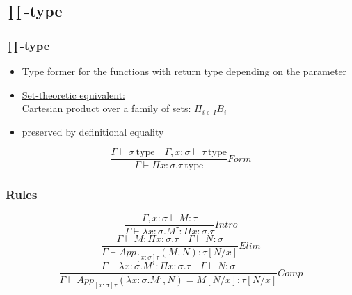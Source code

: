 \documentclass[aspectratio=169]{beamer}
\newcommand{\typ}{\ \mathrm{type}}
\newcommand{\app}[2]{App_{[x:\sigma]\tau}(#1, #2)}
\newcommand{\C}{Comp}
\newcommand{\Intro}{Intro}
\newcommand{\F}{Form}
\newcommand{\E}{Elim}
\begin{document}
    \subsection{$\prod$-type}
    \begin{frame}
        \frametitle{$\prod$-type}
        \begin{itemize}
            \item Type former for the functions with return type depending on the parameter
            \item \underline{Set-theoretic equivalent:}\\
            Cartesian product over a family of sets: $\Pi_{i\in I}B_i$
            \item preserved by definitional equality
        \end{itemize}
        \vspace{40pt}
        $$\frac{\Gamma \vdash \sigma \typ \quad \Gamma,x:\sigma\vdash \tau \typ}{\Gamma \vdash \Pi x:\sigma.\tau \typ}\F$$
    \end{frame}
    \begin{frame}
        \frametitle{Rules}
        $$\frac{\Gamma, x:\sigma \vdash M : \tau}{\Gamma \vdash \lambda x:\sigma.M^\tau : \Pi x:\sigma.\tau}\Intro$$
        \vspace{20pt}
        $$\frac{\Gamma \vdash M : \Pi x: \sigma . \tau \quad \Gamma \vdash N: \sigma}{\Gamma \vdash \app{M}{N}: \tau[N/x]}\E$$
        \vspace{20pt}
        $$\frac{\Gamma \vdash \lambda x:\sigma.M^\tau:\Pi x:\sigma.\tau \quad \Gamma \vdash N:\sigma}{\Gamma \vdash \app{\lambda x:\sigma.M^{\tau}}{N} = M[N/x]:\tau[N/x]}\C$$
    \end{frame}
\end{document}
